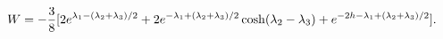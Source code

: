 \begin{equation}
W= -{3\over8} [2 e^{\lambda_1 - (\lambda_2+\lambda_3)/2} + 2
e^{-\lambda_1 +(\lambda_2+\lambda_3)/2} 
\cosh(\lambda_2 -\lambda_3) + e^{-2h -\lambda_1 + (\lambda_2+\lambda_3)/2}].
\end{equation}

